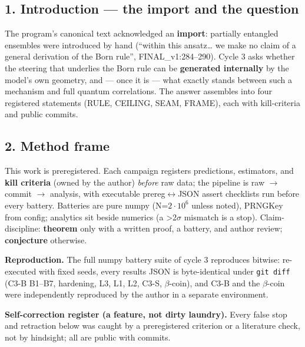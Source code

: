 \documentclass[
  11pt]{article}
\begin{document}
\subsection{1. Introduction --- the import and the
question}\label{introduction-the-import-and-the-question}

The program's canonical text acknowledged an \textbf{import}: partially
entangled ensembles were introduced by hand (``within this
ansatz\ldots{} we make no claim of a general derivation of the Born
rule'', FINAL\_v1:284--290). Cycle 3 asks whether the steering that
underlies the Born rule can be \textbf{generated internally} by the
model's own geometry, and --- once it is --- what exactly stands between
such a mechanism and full quantum correlations. The answer assembles
into four registered statements (RULE, CEILING, SEAM, FRAME), each with
kill-criteria and public commits.

\subsection{2. Method frame}\label{method-frame}

This work is preregistered. Each campaign registers predictions,
estimators, and \textbf{kill criteria} (owned by the author)
\emph{before} raw data; the pipeline is raw $\to$ commit $\to$ analysis, with
executable prereg$\leftrightarrow$JSON assert checklists run before every battery.
Batteries are pure numpy (N=$2\cdot 10^{6}$ unless noted), PRNGKey from config;
analytics sit beside numerics (a \textgreater2$\sigma$ mismatch is a stop).
Claim-discipline: \textbf{theorem} only with a written proof, a battery,
and author review; \textbf{conjecture} otherwise.

\textbf{Reproduction.} The full numpy battery suite of cycle 3
reproduces bitwise: re-executed with fixed seeds, every results JSON is
byte-identical under \texttt{git\ diff} (C3-B B1--B7, hardening, L3, L1,
L2, C3-S, $\beta$-coin), and C3-B and the $\beta$-coin were independently reproduced
by the author in a separate environment.

\textbf{Self-correction register (a feature, not dirty laundry).} Every
false stop and retraction below was caught by a preregistered criterion
or a literature check, not by hindsight; all are public with commits.
\end{document}
